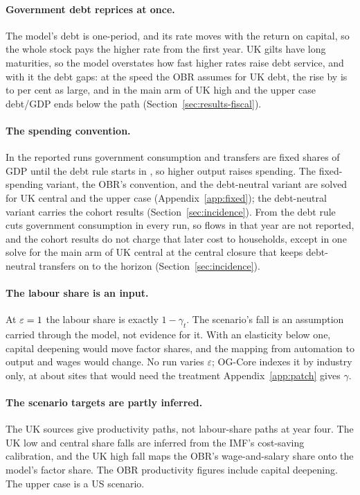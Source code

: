 \paragraph{Government debt reprices at once.} The model's debt is one-period, and its rate moves with the return on capital, so the whole stock pays the higher rate from the first year. UK gilts have long maturities, so the model overstates how fast higher rates raise debt service, and with it the \genDebtRuleYear{} debt gaps: at the speed the OBR assumes for UK debt, the rise by \genDebtRuleYear{} is \genRepriceRatioMinPct{} to \genRepriceRatioMaxPct{} per cent as large, and in the main arm of UK high and the upper case debt/GDP ends below the path (Section~\ref{sec:results-fiscal}).

\paragraph{The spending convention.} In the reported runs government consumption and transfers are fixed shares of GDP until the debt rule starts in \genDebtRuleYear{}, so higher output raises spending. The fixed-spending variant, the OBR's convention, and the debt-neutral variant are solved for UK central and the upper case (Appendix~\ref{app:fixed}); the debt-neutral variant carries the cohort results (Section~\ref{sec:incidence}). From \genDebtRuleYear{} the debt rule cuts government consumption in every run, so flows in that year are not reported, and the cohort results do not charge that later cost to households, except in one solve for the main arm of UK central at the central closure that keeps debt-neutral transfers on to the horizon (Section~\ref{sec:incidence}).

\paragraph{The labour share is an input.} At $\varepsilon = 1{}$ the labour share is exactly $1-\gamma_t$. The scenario's fall is an assumption carried through the model, not evidence for it. With an elasticity below one, capital deepening would move factor shares, and the mapping from automation to output and wages would change. No run varies $\varepsilon$; OG-Core indexes it by industry only, at about \genPatchEpsilonSites{} sites that would need the treatment Appendix~\ref{app:patch} gives $\gamma$.

\paragraph{The scenario targets are partly inferred.} The UK sources give productivity paths, not labour-share paths at year four. The UK low and central share falls are inferred from the IMF's cost-saving calibration, and the UK high fall maps the OBR's wage-and-salary share onto the model's factor share. The OBR productivity figures include capital deepening. The upper case is a US scenario.

